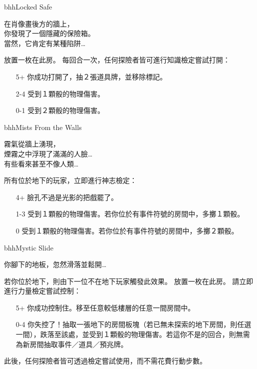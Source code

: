 \linebreak[0]%
\begin{EventCard}{bhh}{Locked Safe}
	\begin{CardStory}
		在肖像畫後方的牆上，\\
		你發現了一個隱藏的保險箱。\\
		當然，它肯定有某種陷阱…
	\end{CardStory}
	放置一枚在此房。\smallbreak
	每回合一次，任何探險者皆可進行知識檢定嘗試打開：
	\begin{itemize}
		\item[5+] 你成功打開了，抽２張道具牌，並移除標記。
		\item[2-4] 受到１顆骰的物理傷害。
		\item[0-1] 受到２顆骰的物理傷害。
	\end{itemize}
\end{EventCard}%
\linebreak[0]%
\begin{EventCard}{bhh}{Mists From the Walls}
	\begin{CardStory}
		霧氣從牆上湧現，\\
		煙霧之中浮現了滿滿的人臉…\\
		有些看來甚至不像人類…
	\end{CardStory}
	所有位於地下的玩家，立即進行神志檢定：
	\begin{itemize}
		\item[4+] 臉孔不過是光影的把戲罷了。
		\item[1-3] 受到１顆骰的物理傷害。若你位於有事件符號的房間中，多擲１顆骰。
		\item[0] 受到１顆骰的物理傷害。若你位於有事件符號的房間中，多擲２顆骰。
	\end{itemize}
\end{EventCard}%
\linebreak[0]%
\begin{EventCard}{bhh}{Mystic Slide}
	\begin{CardStory}
		你腳下的地板，忽然滑落並鬆開…
	\end{CardStory}
	\footnotesize
	若你位於地下，則由下一位不在地下玩家觸發此效果。\smallbreak
	放置一枚在此房。\smallbreak
	請立即進行力量檢定嘗試控制：
	\begin{itemize}
		\item[5+] 你成功控制住。移至任意較低樓層的任意一間房間中。
		\item[0-4] 你失控了！抽取一張地下的房間板塊（若已無未探索的地下房間，則任選一間），跌落至該處，並受到１顆骰的物理傷害。若這你不是的回合，則無需為新房間抽取事件／道具／預兆牌。
	\end{itemize}
	此後，任何探險者皆可透過檢定嘗試使用，而不需花費行動步數。\smallbreak
\end{EventCard}%
